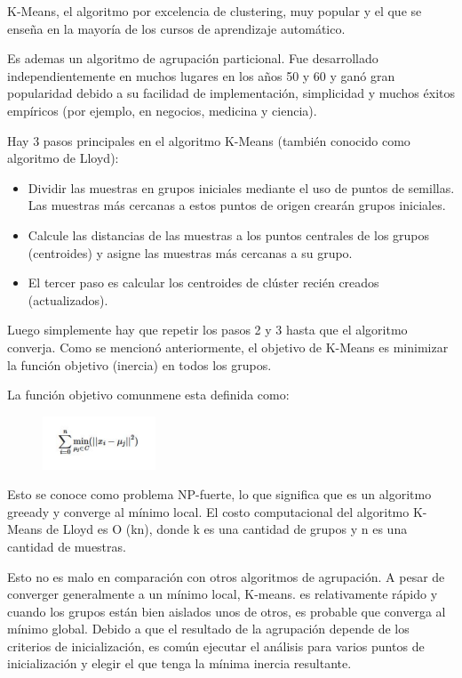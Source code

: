 \documentclass[12pt, fleqn]{report}                             %
\theoremstyle{break}                                            %
\begin{document}
        K-Means, el algoritmo por excelencia de clustering, muy popular y el que se enseña en la mayoría de los cursos de aprendizaje automático.
        
        Es ademas un algoritmo de agrupación particional.
        Fue desarrollado independientemente en muchos lugares en los años 50 y 60 y ganó gran popularidad debido a su 
        facilidad de implementación, simplicidad y muchos éxitos empíricos (por ejemplo, en negocios, medicina y ciencia).

        Hay 3 pasos principales en el algoritmo K-Means (también conocido como algoritmo de Lloyd):
        \begin{itemize}
            \item Dividir las muestras en grupos iniciales mediante el uso de puntos de semillas. Las muestras más cercanas a estos puntos de origen crearán grupos iniciales.
            \item Calcule las distancias de las muestras a los puntos centrales de los grupos (centroides) y asigne las muestras más cercanas a su grupo.
            \item El tercer paso es calcular los centroides de clúster recién creados (actualizados).
        \end{itemize}

        Luego simplemente hay que repetir los pasos 2 y 3 hasta que el algoritmo converja.
        Como se mencionó anteriormente, el objetivo de K-Means es minimizar la función objetivo (inercia) 
        en todos los grupos. 
        
        La función objetivo comunmene esta definida como:
        \begin{figure}[ht!]
            \includegraphics[width=0.3\textwidth]{min}
        \end{figure}

        Esto se conoce como problema NP-fuerte, lo que significa que es un algoritmo greeady y converge al mínimo local. 
        El costo computacional del algoritmo K-Means de Lloyd es O (kn), donde k es una cantidad de grupos y n es una cantidad de muestras. 

        Esto no es malo en comparación con otros algoritmos de agrupación. A pesar de converger generalmente a un mínimo local, K-means.
        es relativamente rápido y cuando los grupos están bien aislados unos de otros, 
        es probable que converga al mínimo global. Debido a que el resultado de la agrupación depende de los criterios de inicialización, 
        es común ejecutar el análisis para varios puntos de inicialización y elegir el que tenga la mínima inercia resultante.
            
\end{document}
